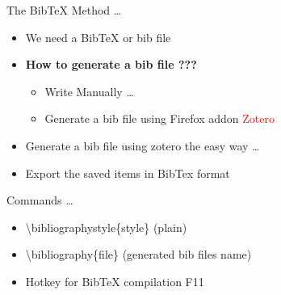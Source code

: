 \documentclass{beamer}
\begin{document}
\begin{frame}{The BibTeX Method \ldots}
\begin{itemize}
\pause \item We need a BibTeX or bib file \vspace{0.5cm}
\pause \item \textbf{How to generate a bib file ???}
\begin{itemize}
\pause \item Write Manually \ldots
\pause \item Generate a bib file using Firefox addon \textcolor{red}{Zotero}
\end{itemize}
\pause \item Generate a bib file using zotero the easy way \ldots
\pause \item Export the saved items in BibTex format
\end{itemize}
\end{frame}
\begin{frame}{Commands \ldots}
\begin{itemize}
\pause \item \textbackslash bibliographystyle\{style\} (plain)\\
\pause \item \textbackslash bibliography\{file\} (generated bib files name)
\pause \item Hotkey for BibTeX compilation F11
\end{itemize}
\end{frame}
\end{document}
